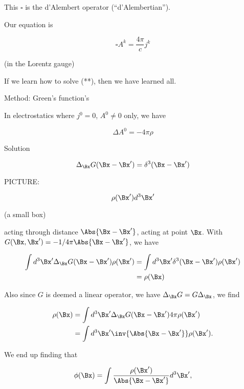 This $\square$ is the d'Alembert operator (``d'Alembertian'').

Our equation is 

\begin{equation}\label{eqn:relativisticElectrodynamicsL17:310}
\square A^k = \frac{4 \pi}{c} j^k
\end{equation}

(in the Lorentz gauge)

If we learn how to solve (**), then we have learned all.

Method: Green's function's

In electrostatics where $j^0 = 0$, $A^0 \ne 0$ only, we have

\begin{equation}\label{eqn:relativisticElectrodynamicsL17:330}
\Delta A^0 = -4 \pi \rho
\end{equation}

Solution 

\begin{equation}\label{eqn:relativisticElectrodynamicsL17:350}
\Delta_{\Bx} G(\Bx - \Bx') = \delta^3( \Bx - \Bx')
\end{equation}

PICTURE: 

\begin{equation}\label{eqn:relativisticElectrodynamicsL17:370}
\rho(\Bx') d^3 \Bx'
\end{equation}

(a small box)

acting through distance $\Abs{\Bx - \Bx'}$, acting at point $\Bx$.  With $G(\Bx, \Bx') = -1/4 \pi\Abs{\Bx - \Bx'}$, we have

\begin{align*}
\int d^3 \Bx' \Delta_{\Bx} G(\Bx - \Bx') \rho(\Bx') 
&= \int d^3 \Bx' \delta^3( \Bx - \Bx') \rho(\Bx') \\
&= \rho(\Bx)
\end{align*}

Also since $G$ is deemed a linear operator, we have $\Delta_\Bx G = G \Delta_\Bx$, we find

\begin{align*}
\rho(\Bx)
&=
\int d^3 \Bx' \Delta_{\Bx} G(\Bx - \Bx') 4 \pi \rho(\Bx') \\
&=
\int d^3 \Bx' \inv{\Abs{\Bx - \Bx'}} \rho(\Bx').
\end{align*}

We end up finding that 

\begin{equation}\label{eqn:relativisticElectrodynamicsL17:390}
\phi(\Bx) = \int \frac{\rho(\Bx')}{\Abs{\Bx - \Bx'}} d^3 \Bx',
\end{equation}

